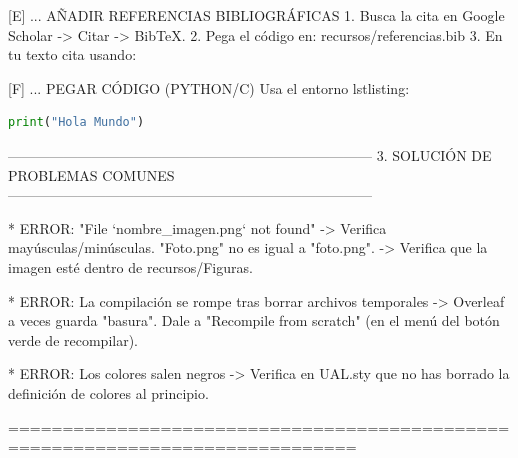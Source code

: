 [E] ... AÑADIR REFERENCIAS BIBLIOGRÁFICAS
    1. Busca la cita en Google Scholar -> Citar -> BibTeX.
    2. Pega el código en: recursos/referencias.bib
    3. En tu texto cita usando: \cite{clave_de_la_cita}

[F] ... PEGAR CÓDIGO (PYTHON/C)
    Usa el entorno lstlisting:
    \begin{lstlisting}[language=Python, caption={Descripción}]
       print("Hola Mundo")
    \end{lstlisting}

------------------------------------------------------------------------------
3. SOLUCIÓN DE PROBLEMAS COMUNES
------------------------------------------------------------------------------

* ERROR: "File `nombre_imagen.png` not found"
  -> Verifica mayúsculas/minúsculas. "Foto.png" no es igual a "foto.png".
  -> Verifica que la imagen esté dentro de recursos/Figuras.

* ERROR: La compilación se rompe tras borrar archivos temporales
  -> Overleaf a veces guarda "basura". Dale a "Recompile from scratch" (en el
     menú del botón verde de recompilar).

* ERROR: Los colores salen negros
  -> Verifica en UAL.sty que no has borrado la definición de colores al principio.

==============================================================================